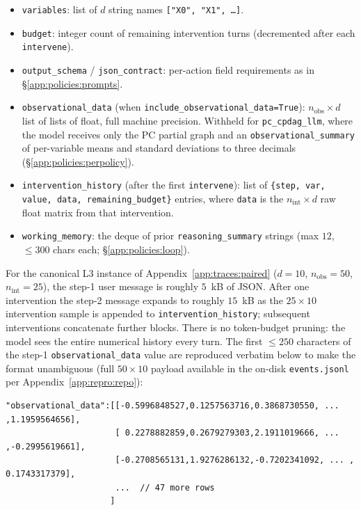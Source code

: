 \begin{itemize}
\itemsep0pt
\item \texttt{variables}: list of $d$ string names \texttt{["X0", "X1", \ldots]}.
\item \texttt{budget}: integer count of remaining intervention turns (decremented after each \texttt{intervene}).
\item \texttt{output\_schema} / \texttt{json\_contract}: per-action field requirements as in §\ref{app:policies:prompts}.
\item \texttt{observational\_data} (when \texttt{include\_observational\_data=True}): $n_\text{obs} \times d$ list of lists of float, full machine precision. Withheld for \texttt{pc\_cpdag\_llm}, where the model receives only the PC partial graph and an \texttt{observational\_summary} of per-variable means and standard deviations to three decimals (§\ref{app:policies:perpolicy}).
\item \texttt{intervention\_history} (after the first \texttt{intervene}): list of \texttt{\{step, var, value, data, remaining\_budget\}} entries, where \texttt{data} is the $n_\text{int} \times d$ raw float matrix from that intervention.
\item \texttt{working\_memory}: the deque of prior \texttt{reasoning\_summary} strings (max $12$, $\le 300$ chars each; §\ref{app:policies:loop}).
\end{itemize}

For the canonical L3 instance of Appendix~\ref{app:traces:paired} ($d = 10$, $n_\text{obs} = 50$, $n_\text{int} = 25$), the step-1 user message is roughly $5$~kB of JSON. After one intervention the step-2 message expands to roughly $15$~kB as the $25 \times 10$ intervention sample is appended to \texttt{intervention\_history}; subsequent interventions concatenate further blocks. There is no token-budget pruning: the model sees the entire numerical history every turn. The first $\le 250$ characters of the step-1 \texttt{observational\_data} value are reproduced verbatim below to make the format unambiguous (full $50 \times 10$ payload available in the on-disk \texttt{events.jsonl} per Appendix~\ref{app:repro:repo}):

\begin{center}
\small
\begin{verbatim}
"observational_data":[[-0.5996848527,0.1257563716,0.3868730550, ... ,1.1959564656],
                      [ 0.2278882859,0.2679279303,2.1911019666, ... ,-0.2995619661],
                      [-0.2708565131,1.9276286132,-0.7202341092, ... , 0.1743317379],
                      ...  // 47 more rows
                     ]
\end{verbatim}
\end{center}

